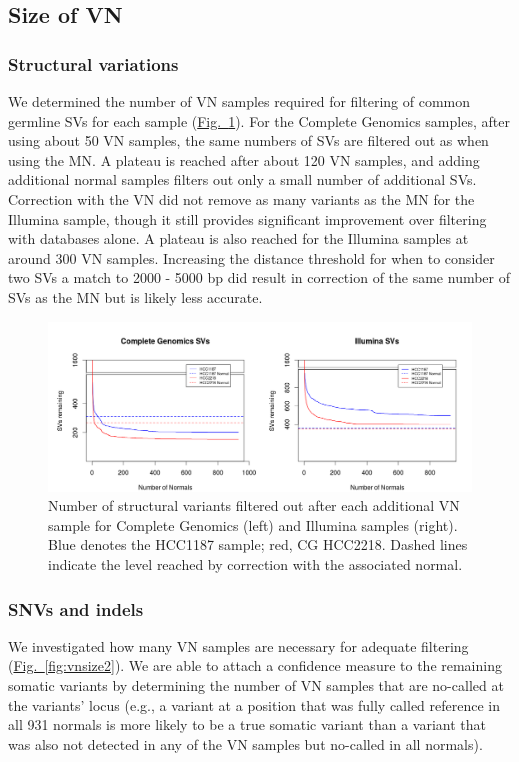 \subsection*{Size of VN}

\subsubsection*{Structural variations}
We determined the number of VN samples required for filtering of common germline SVs for each sample (\hyperref[fig:vnsize]{Fig.~\ref{fig:vnsize}}). For the Complete Genomics samples, after using about 50 VN samples, the same numbers of SVs are filtered out as when using the MN\@. A plateau is reached after about 120 VN samples, and adding additional normal samples filters out only a small number of additional SVs. Correction with the VN did not remove as many variants as the MN for the Illumina sample, though it still provides significant improvement over filtering with databases alone. A plateau is also reached for the Illumina samples at around 300 VN samples. Increasing the distance threshold for when to consider two SVs a match to 2000 - 5000 bp did result in correction of the same number of SVs as the MN but is likely less accurate.

\begin{figure}[t!]
\centering
\includegraphics[width=\textwidth]{chapters/images/virtualnormal/Hiltemann_Figure3.png}
\caption{Number of structural variants filtered out after each additional VN sample for Complete Genomics (left) and Illumina samples (right). Blue denotes the HCC1187 sample; red, CG HCC2218. Dashed lines indicate the level reached by correction with the associated normal. }
\label{fig:vnsize}
\end{figure}

\subsubsection*{SNVs and indels}
We investigated how many VN samples are necessary for adequate filtering (\hyperref[fig:vnsize2]{Fig.~\ref{fig:vnsize2}}). We are able to attach a confidence measure to the remaining somatic variants by determining the number of VN samples that are no-called at the variants’ locus (e.g., a variant at a position that was fully called reference in all 931 normals is more likely to be a true somatic variant than a variant that was also not detected in any of the VN samples but no-called in all normals).


